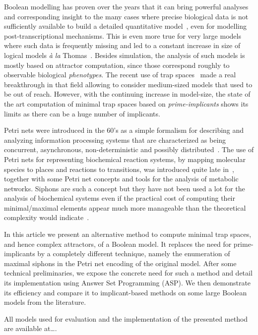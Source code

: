 \documentclass[runningheads]{llncs}
\begin{document}
Boolean modelling has proven over the years that it can bring powerful analyses and corresponding insight to the many cases where precise biological data is not sufficiently available to build a detailed quantitative model~\cite{wang2012boolean}, even for modelling post-transcriptional mechanisms.
This is even more true for very large models where such data is frequently missing and led to a constant increase in size of logical models \emph{à la} Thomas~\cite{aghamiri2020automated}.
Besides simulation, the analysis of such models is mostly based on attractor computation, since those correspond roughly to observable biological \emph{phenotypes}. The recent use of trap spaces~\cite{klarner2015computing} made a real breakthrough in that field allowing to consider medium-sized models that used to be out of reach.
However, with the continuing increase in model-size, the state of the art computation of minimal trap spaces based on \emph{prime-implicants} shows its limits as there can be a huge number of implicants.

Petri nets were introduced in the 60’s as a simple formalism for describing and analyzing information processing systems that are characterized as being concurrent, asynchronous, non-deterministic and possibly distributed~\cite{peterson1981petri,Murata1989}.
The use of Petri nets for representing biochemical reaction systems, by mapping molecular species to places and reactions to transitions, was introduced quite late in~\cite{reddy1993petri}, together with some Petri net concepts and tools for the analysis of metabolic networks.
Siphons are such a concept but they have not been used a lot for the analysis of biochemical systems even if the practical cost of computing their minimal/maximal elements appear much more manageable than the theoretical complexity would indicate~\cite{nabli2016enumerating}.

In this article we present an alternative method to compute minimal trap spaces, and hence complex attractors, of a Boolean model. It replaces the need for prime-implicants by a completely different technique, namely the enumeration of maximal siphons in the Petri net encoding of the original model.
After some technical preliminaries, we expose the concrete need for such a method and detail its implementation using Answer Set Programming (ASP).
We then demonstrate its efficiency and compare it to implicant-based methods on some large Boolean models from the literature.

All models used for evaluation and the implementation of the presented method are available at\dots.
\end{document}
